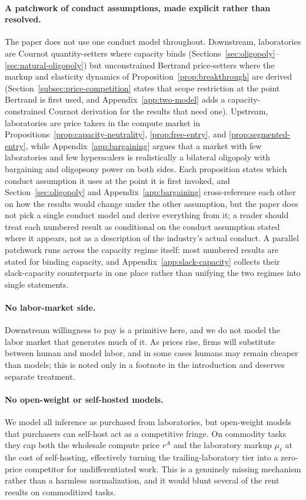 \documentclass[11pt]{article}
\begin{document}
\paragraph{A patchwork of conduct assumptions, made explicit rather than resolved.} The paper does not use one conduct model throughout. Downstream, laboratories are Cournot quantity-setters where capacity binds (Sections~\ref{sec:oligopoly}--\ref{sec:natural-oligopoly}) but unconstrained Bertrand price-setters where the markup and elasticity dynamics of Proposition~\ref{prop:breakthrough} are derived (Section~\ref{subsec:price-competition} states that scope restriction at the point Bertrand is first used, and Appendix~\ref{app:two-model} adds a capacity-constrained Cournot derivation for the results that need one). Upstream, laboratories are price takers in the compute market in Propositions~\ref{prop:capacity-neutrality}, \ref{prop:free-entry}, and \ref{prop:segmented-entry}, while Appendix~\ref{app:bargaining} argues that a market with few laboratories and few hyperscalers is realistically a bilateral oligopoly with bargaining and oligopsony power on both sides. Each proposition states which conduct assumption it uses at the point it is first invoked, and Section~\ref{sec:oligopoly} and Appendix~\ref{app:bargaining} cross-reference each other on how the results would change under the other assumption, but the paper does not pick a single conduct model and derive everything from it; a reader should treat each numbered result as conditional on the conduct assumption stated where it appears, not as a description of the industry's actual conduct. A parallel patchwork runs across the capacity regime itself: most numbered results are stated for binding capacity, and Appendix~\ref{app:slack-capacity} collects their slack-capacity counterparts in one place rather than unifying the two regimes into single statements.

\paragraph{No labor-market side.} Downstream willingness to pay is a primitive here, and we do not model the labor market that generates much of it. As prices rise, firms will substitute between human and model labor, and in some cases humans may remain cheaper than models; this is noted only in a footnote in the introduction and deserves separate treatment.

\paragraph{No open-weight or self-hosted models.} We model all inference as purchased from laboratories, but open-weight models that purchasers can self-host act as a competitive fringe. On commodity tasks they cap both the wholesale compute price $r^A$ and the laboratory markup $\mu_\ell$ at the cost of self-hosting, effectively turning the trailing-laboratory tier into a zero-price competitor for undifferentiated work. This is a genuinely missing mechanism rather than a harmless normalization, and it would blunt several of the rent results on commoditized tasks.
\end{document}
